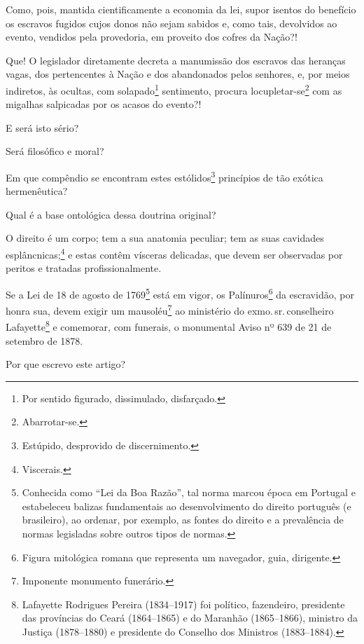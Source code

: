 Como, pois, mantida cientificamente a economia da lei, supor isentos do
benefício os escravos fugidos cujos donos não sejam sabidos e,
como tais, devolvidos ao evento, vendidos pela provedoria, em proveito
dos cofres da Nação?!

Que! O legislador diretamente decreta a manumissão dos escravos das
heranças vagas, dos pertencentes à Nação e dos abandonados pelos
senhores, e, por meios indiretos, às ocultas, com solapado\footnote{
  Por sentido figurado, dissimulado, disfarçado.} sentimento, procura
locupletar-se\footnote{Abarrotar-se.} com as migalhas salpicadas por
os acasos do evento?!

E será isto sério?

Será filosófico e moral?

Em que compêndio se encontram estes estólidos\footnote{Estúpido,
  desprovido de discernimento.} princípios de tão exótica hermenêutica?

Qual é a base ontológica dessa doutrina original?

O direito é um corpo; tem a sua anatomia peculiar; tem as suas cavidades
esplâncnicas;\footnote{Viscerais.} e estas contêm vísceras delicadas,
que devem ser observadas por peritos e tratadas profissionalmente.

Se a Lei de 18 de agosto de 1769\footnote{Conhecida como ``Lei da Boa
  Razão'', tal norma marcou época em Portugal e estabeleceu balizas
  fundamentais ao desenvolvimento do direito português (e brasileiro),
  ao ordenar, por exemplo, as fontes do direito e a prevalência de
  normas legisladas sobre outros tipos de normas.} está em vigor, os
Palínuros\footnote{Figura mitológica romana que representa um
  navegador, guia, dirigente.} da escravidão, por honra sua, devem
exigir um mausoléu\footnote{Imponente monumento funerário.} ao
ministério do exmo.\,sr.\,conselheiro Lafayette\footnote{Lafayette
  Rodrigues Pereira (1834--1917) foi político, fazendeiro, presidente
  das províncias do Ceará (1864--1865) e do Maranhão (1865--1866),
  ministro da Justiça (1878--1880) e presidente do Conselho dos Ministros
  (1883--1884).} e comemorar, com funerais, o monumental Aviso nº 639 de
21 de setembro de 1878.

\asterisc

Por que escrevo este artigo?

